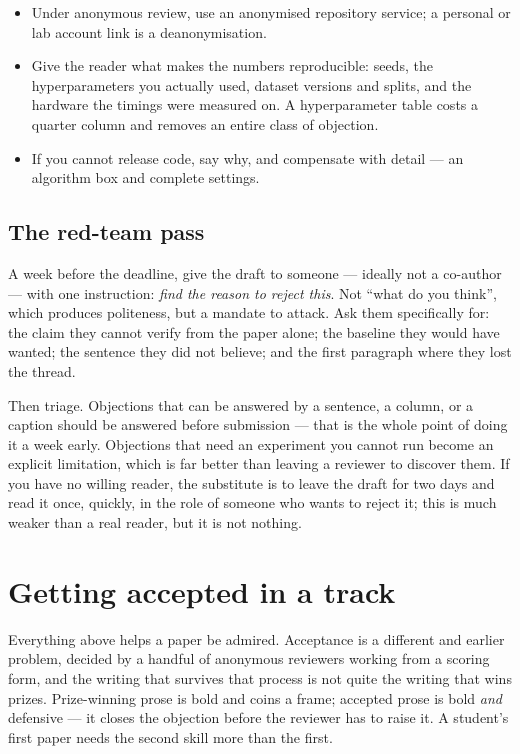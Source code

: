 \documentclass[11pt,a4paper]{article}
\begin{document}
\begin{itemize}
  \item Under anonymous review, use an anonymised repository service; a
    personal or lab account link is a deanonymisation.
  \item Give the reader what makes the numbers reproducible: seeds, the
    hyperparameters you actually used, dataset versions and splits, and the
    hardware the timings were measured on. A hyperparameter table costs a
    quarter column and removes an entire class of objection.
  \item If you cannot release code, say why, and compensate with detail ---
    an algorithm box and complete settings.
\end{itemize}

\subsection*{The red-team pass}

A week before the deadline, give the draft to someone --- ideally not a
co-author --- with one instruction: \emph{find the reason to reject this}.
Not ``what do you think'', which produces politeness, but a mandate to
attack. Ask them specifically for: the claim they cannot verify from the
paper alone; the baseline they would have wanted; the sentence they did not
believe; and the first paragraph where they lost the thread.

Then triage. Objections that can be answered by a sentence, a column, or a
caption should be answered before submission --- that is the whole point of
doing it a week early. Objections that need an experiment you cannot run
become an explicit limitation, which is far better than leaving a reviewer to
discover them. If you have no willing reader, the substitute is to leave the
draft for two days and read it once, quickly, in the role of someone who
wants to reject it; this is much weaker than a real reader, but it is not
nothing.

\section{Getting accepted in a track}

Everything above helps a paper be admired. Acceptance is a different and
earlier problem, decided by a handful of anonymous reviewers working from a
scoring form, and the writing that survives that process is not quite the
writing that wins prizes. Prize-winning prose is bold and coins a frame;
accepted prose is bold \emph{and} defensive --- it closes the objection
before the reviewer has to raise it. A student's first paper needs the second
skill more than the first.
\end{document}
